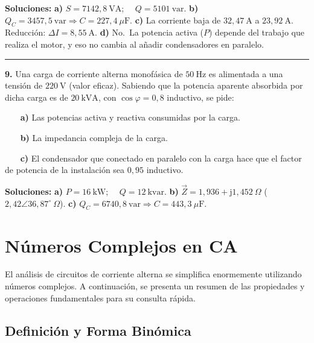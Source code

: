 \documentclass[
  a4paper,
  DIV=11,
  numbers=noendperiod]{scrreprt}
\begin{document}
\begin{tcolorbox}[enhanced jigsaw, breakable, colback=white, left=2mm, leftrule=.75mm, rightrule=.15mm, toprule=.15mm, colframe=quarto-callout-important-color-frame, arc=.35mm, bottomrule=.15mm, opacityback=0]
\textbf{Soluciones:} \textbf{a)} \(S = 7142,8\ \text{VA}\);
\(\quad Q = 5101\ \text{var}\). \textbf{b)}
\(Q_C = 3457,5\ \text{var} \Rightarrow C = 227,4\ \mu\text{F}\).
\textbf{c)} La corriente baja de \(32,47\ \text{A}\) a
\(23,92\ \text{A}\). Reducción: \(\Delta I = 8,55\ \text{A}\).
\textbf{d)} No.~La potencia activa (\(P\)) depende del trabajo que
realiza el motor, y eso no cambia al añadir condensadores en paralelo.

\begin{center}\rule{0.5\linewidth}{0.5pt}\end{center}

\textbf{9.} Una carga de corriente alterna monofásica de
\(50\ \text{Hz}\) es alimentada a una tensión de \(220\ \text{V}\)
(valor eficaz). Sabiendo que la potencia aparente absorbida por dicha
carga es de \(20\ \text{kVA}\), con \(\cos \varphi = 0,8\) inductivo, se
pide:

~~~ \textbf{a)} Las potencias activa y reactiva consumidas por la
carga.\\
\strut ~~~ \textbf{b)} La impedancia compleja de la carga.\\
\strut ~~~ \textbf{c)} El condensador que conectado en paralelo con la
carga hace que el factor de potencia de la instalación sea \(0,95\)
inductivo.

\textbf{Soluciones:} \textbf{a)} \(P = 16\ \text{kW}\);
\(\quad Q = 12\ \text{kvar}\). \textbf{b)}
\(\vec{Z} = 1,936 + \mathrm{j}1,452\ \Omega\)
(\(2,42 \angle 36,87^\circ\ \Omega\)). \textbf{c)}
\(Q_C = 6740,8\ \text{var} \Rightarrow C = 443,3\ \mu\text{F}\).

\end{tcolorbox}

\cleardoublepage
{}
{}
\appendix

\chapter{Números Complejos en CA}\label{sec-anexo-complejos}

El análisis de circuitos de corriente alterna se simplifica enormemente
utilizando números complejos. A continuación, se presenta un resumen de
las propiedades y operaciones fundamentales para su consulta rápida.

\section{Definición y Forma
Binómica}\label{definiciuxf3n-y-forma-binuxf3mica}
\end{document}
